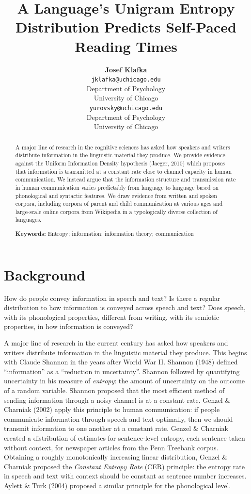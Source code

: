 \documentclass[10pt, letterpaper]{article}
\title{A Language's Unigram Entropy Distribution Predicts Self-Paced Reading
Times}
\author{{\large \bf Josef Klafka} \\ \texttt{jklafka@uchicago.edu} \\ Department of Psychology \\ University of Chicago \And {\large \bf Daniel Yurovsky} \\ \texttt{yurovsky@uchicago.edu} \\ Department of Psychology \\ University of Chicago}
\begin{document}
\maketitle

\begin{abstract}
A major line of research in the cognitive sciences has asked how
speakers and writers distribute information in the linguistic material
they produce. We provide evidence against the Uniform Information
Density hypothesis (Jaeger, 2010) which proposes that information is
transmitted at a constant rate close to channel capacity in human
communication. We instead argue that the information structure and
transmission rate in human communication varies predictably from
language to language based on phonological and syntactic features. We
draw evidence from written and spoken corpora, including corpora of
parent and child communication at various ages and large-scale online
corpora from Wikipedia in a typologically diverse collection of
languages.

\textbf{Keywords:}
Entropy; information; information theory; communication
\end{abstract}

\section{Background}\label{background}

How do people convey information in speech and text? Is there a regular
distribution to how information is conveyed across speech and text? Does
speech, with its phonological properties, different from writing, with
its semiotic properties, in how information is conveyed?

A major line of research in the current century has asked how speakers
and writers distribute information in the linguistic material they
produce. This begins with Claude Shannon in the years after World War
II. Shannon (1948) defined ``information'' as a ``reduction in
uncertainty''. Shannon followed by quantifying uncertainty in his
measure of \emph{entropy}: the amount of uncertainty on the outcome of a
random variable. Shannon proposed that the most efficient method of
sending information through a noisy channel is at a constant rate.
Genzel \& Charniak (2002) apply this principle to human communication:
if people communicate information through speech and text optimally,
then we should transmit information to one another at a constant rate.
Genzel \& Charniak created a distribution of estimates for
sentence-level entropy, each sentence taken without context, for
newspaper articles from the Penn Treebank corpus. Obtaining a roughly
monotonically increasing linear distribution, Genzel \& Charniak
proposed the \emph{Constant Entropy Rate} (CER) principle: the entropy
rate in speech and text with context should be constant as sentence
number increases. Aylett \& Turk (2004) proposed a similar principle for
the phonological level.
\end{document}

